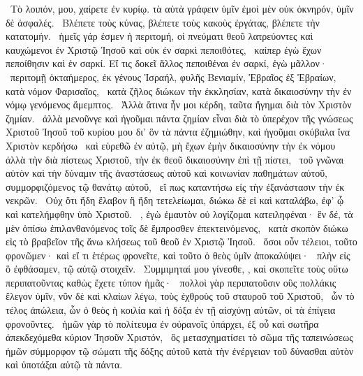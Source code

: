 ~Τὸ λοιπόν,  μου, χαίρετε ἐν κυρίῳ. τὰ αὐτὰ γράφειν ὑμῖν ἐμοὶ μὲν οὐκ ὀκνηρόν, ὑμῖν δὲ ἀσφαλές.
~Βλέπετε τοὺς κύνας, βλέπετε τοὺς κακοὺς ἐργάτας, βλέπετε τὴν κατατομήν.
~ἡμεῖς γάρ ἐσμεν ἡ περιτομή, οἱ πνεύματι θεοῦ λατρεύοντες καὶ καυχώμενοι ἐν Χριστῷ Ἰησοῦ καὶ οὐκ ἐν σαρκὶ πεποιθότες,
~καίπερ ἐγὼ ἔχων πεποίθησιν καὶ ἐν σαρκί. Εἴ τις δοκεῖ ἄλλος πεποιθέναι ἐν σαρκί, ἐγὼ μᾶλλον·
~περιτομῇ ὀκταήμερος, ἐκ γένους Ἰσραήλ, φυλῆς Βενιαμίν, Ἑβραῖος ἐξ Ἑβραίων, κατὰ νόμον Φαρισαῖος,
~κατὰ ζῆλος διώκων τὴν ἐκκλησίαν, κατὰ δικαιοσύνην τὴν ἐν νόμῳ γενόμενος ἄμεμπτος.
~Ἀλλὰ ἅτινα ἦν μοι κέρδη, ταῦτα ἥγημαι διὰ τὸν Χριστὸν ζημίαν.
~ἀλλὰ μενοῦνγε καὶ ἡγοῦμαι πάντα ζημίαν εἶναι διὰ τὸ ὑπερέχον τῆς γνώσεως Χριστοῦ Ἰησοῦ τοῦ κυρίου μου δι’ ὃν τὰ πάντα ἐζημιώθην, καὶ ἡγοῦμαι σκύβαλα ἵνα Χριστὸν κερδήσω
~καὶ εὑρεθῶ ἐν αὐτῷ, μὴ ἔχων ἐμὴν δικαιοσύνην τὴν ἐκ νόμου ἀλλὰ τὴν διὰ πίστεως Χριστοῦ, τὴν ἐκ θεοῦ δικαιοσύνην ἐπὶ τῇ πίστει,
~τοῦ γνῶναι αὐτὸν καὶ τὴν δύναμιν τῆς ἀναστάσεως αὐτοῦ καὶ κοινωνίαν παθημάτων αὐτοῦ, συμμορφιζόμενος τῷ θανάτῳ αὐτοῦ,
~εἴ πως καταντήσω εἰς τὴν ἐξανάστασιν τὴν ἐκ νεκρῶν.
~Οὐχ ὅτι ἤδη ἔλαβον ἢ ἤδη τετελείωμαι, διώκω δὲ εἰ καὶ καταλάβω, ἐφ’ ᾧ καὶ κατελήμφθην ὑπὸ Χριστοῦ.
~, ἐγὼ ἐμαυτὸν οὐ λογίζομαι κατειληφέναι· ἓν δέ, τὰ μὲν ὀπίσω ἐπιλανθανόμενος τοῖς δὲ ἔμπροσθεν ἐπεκτεινόμενος,
~κατὰ σκοπὸν διώκω εἰς τὸ βραβεῖον τῆς ἄνω κλήσεως τοῦ θεοῦ ἐν Χριστῷ Ἰησοῦ.
~ὅσοι οὖν τέλειοι, τοῦτο φρονῶμεν· καὶ εἴ τι ἑτέρως φρονεῖτε, καὶ τοῦτο ὁ θεὸς ὑμῖν ἀποκαλύψει·
~πλὴν εἰς ὃ ἐφθάσαμεν, τῷ αὐτῷ στοιχεῖν.
~Συμμιμηταί μου γίνεσθε, , καὶ σκοπεῖτε τοὺς οὕτω περιπατοῦντας καθὼς ἔχετε τύπον ἡμᾶς·
~πολλοὶ γὰρ περιπατοῦσιν οὓς πολλάκις ἔλεγον ὑμῖν, νῦν δὲ καὶ κλαίων λέγω, τοὺς ἐχθροὺς τοῦ σταυροῦ τοῦ Χριστοῦ,
~ὧν τὸ τέλος ἀπώλεια, ὧν ὁ θεὸς ἡ κοιλία καὶ ἡ δόξα ἐν τῇ αἰσχύνῃ αὐτῶν, οἱ τὰ ἐπίγεια φρονοῦντες.
~ἡμῶν γὰρ τὸ πολίτευμα ἐν οὐρανοῖς ὑπάρχει, ἐξ οὗ καὶ σωτῆρα ἀπεκδεχόμεθα κύριον Ἰησοῦν Χριστόν,
~ὃς μετασχηματίσει τὸ σῶμα τῆς ταπεινώσεως ἡμῶν σύμμορφον τῷ σώματι τῆς δόξης αὐτοῦ κατὰ τὴν ἐνέργειαν τοῦ δύνασθαι αὐτὸν καὶ ὑποτάξαι αὑτῷ τὰ πάντα.

